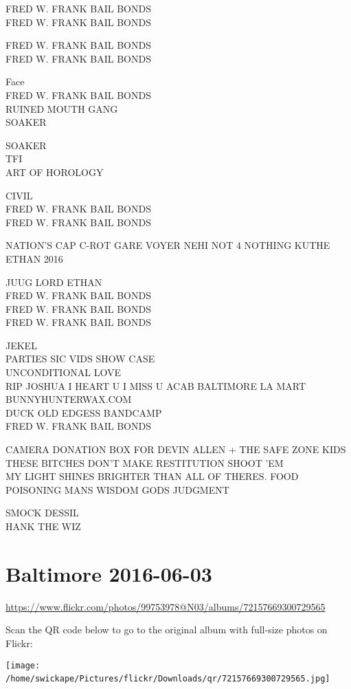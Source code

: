 \documentclass[10pt,letterpaper]{article}
\begin{document}
FRED W. FRANK BAIL BONDS\\
FRED W. FRANK BAIL BONDS

FRED W. FRANK BAIL BONDS\\
FRED W. FRANK BAIL BONDS

Face\\
FRED W. FRANK BAIL BONDS\\
RUINED MOUTH GANG\\
SOAKER

SOAKER\\
TFI\\
ART OF HOROLOGY

CIVIL\\
FRED W. FRANK BAIL BONDS\\
FRED W. FRANK BAIL BONDS

NATION'S CAP C{-}ROT GARE VOYER NEHI NOT 4 NOTHING KUTHE\\
ETHAN 2016

JUUG LORD ETHAN\\
FRED W. FRANK BAIL BONDS\\
FRED W. FRANK BAIL BONDS\\
FRED W. FRANK BAIL BONDS

JEKEL\\
PARTIES SIC VIDS SHOW CASE\\
UNCONDITIONAL LOVE\\
RIP JOSHUA I HEART U I MISS U ACAB
BALTIMORE LA MART\\
BUNNYHUNTERWAX.COM\\
DUCK OLD EDGESS BANDCAMP\\
FRED W. FRANK BAIL BONDS

CAMERA DONATION BOX FOR DEVIN ALLEN + THE SAFE ZONE KIDS\\
THESE BITCHES DON'T MAKE RESTITUTION SHOOT 'EM\\
MY LIGHT SHINES BRIGHTER THAN ALL OF THERES.  FOOD POISONING MANS WISDOM GODS JUDGMENT

SMOCK DESSIL\\
HANK THE WIZ
\

\section*{Baltimore 2016-06-03}

\url{https://www.flickr.com/photos/99753978@N03/albums/72157669300729565}

Scan the QR code below to go to the original album with full-size photos on Flickr:

\texttt{[image: /home/swickape/Pictures/flickr/Downloads/qr/72157669300729565.jpg]}
\
\end{document}
